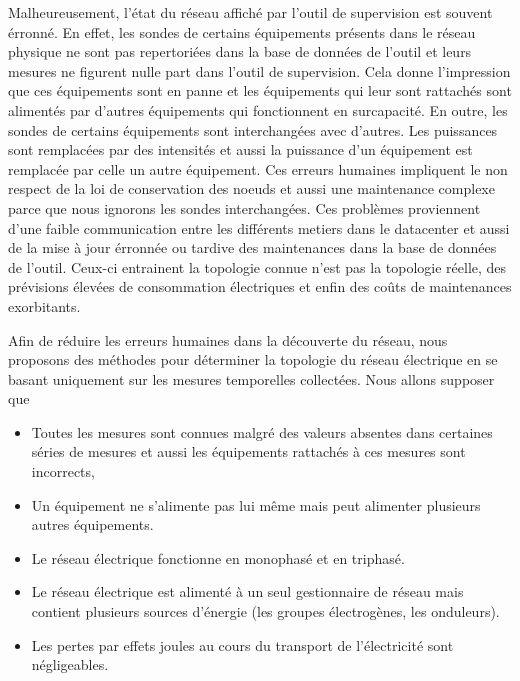 \documentclass[onecolumn, 12pt]{book}
\begin{document}
Malheureusement,  l'\'etat du r\'eseau affich\'e par l'outil de supervision est souvent \'erronn\'e. 
En effet,  les sondes de certains \'equipements pr\'esents dans le r\'eseau physique ne sont pas repertori\'ees dans la base de donn\'ees de l'outil et leurs mesures ne figurent nulle part dans l'outil de supervision. Cela donne l'impression que ces \'equipements sont en panne et  les \'equipements qui leur sont rattach\'es sont aliment\'es par d'autres \'equipements qui fonctionnent en surcapacit\'e.  
En outre, les sondes de certains \'equipements sont interchang\'ees avec d'autres. Les puissances sont remplac\'ees par des intensit\'es et aussi la puissance d'un \'equipement est remplac\'ee par celle  un autre \'equipement. Ces erreurs humaines impliquent le non respect de la loi de conservation des noeuds et aussi une maintenance complexe  parce que nous ignorons les sondes interchang\'ees.
Ces probl\`emes proviennent d'une faible communication  entre les diff\'erents metiers dans le datacenter et aussi de la mise \`a jour \'erronn\'ee ou tardive des maintenances dans la base de donn\'ees de l'outil. Ceux-ci entrainent la topologie connue n'est pas la topologie r\'eelle, des pr\'evisions \'elev\'ees de consommation \'electriques et enfin des co\^uts de maintenances exorbitants.
\newline

Afin de r\'eduire les erreurs humaines dans la d\'ecouverte du r\'eseau, nous proposons des m\'ethodes pour d\'eterminer la topologie du r\'eseau \'electrique en se basant uniquement sur les mesures temporelles collect\'ees.
Nous allons supposer que 
\begin{itemize}
\item Toutes les mesures sont connues malgr\'e des valeurs absentes dans certaines s\'eries de mesures et aussi les \'equipements rattach\'es \`a ces mesures sont incorrects, 
\item Un \'equipement ne s'alimente pas lui m\^eme mais peut alimenter plusieurs autres \'equipements.
\item Le r\'eseau \'electrique fonctionne en monophas\'e et en triphas\'e. 
\item Le r\'eseau \'electrique est aliment\'e \`a un seul gestionnaire de r\'eseau mais contient plusieurs sources d'\'energie (les groupes \'electrog\`enes, les onduleurs).
\item Les pertes par effets joules au cours du transport de l'\'electricit\'e sont n\'egligeables.
\end{itemize}
\end{document}
